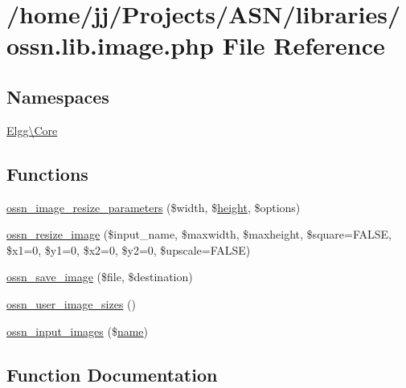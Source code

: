 \hypertarget{ossn_8lib_8image_8php}{}\section{/home/jj/\+Projects/\+A\+S\+N/libraries/ossn.lib.\+image.\+php File Reference}
\label{ossn_8lib_8image_8php}
\subsection*{Namespaces}
\begin{DoxyCompactItemize}
\item 
 \hyperlink{namespace_elgg_1_1_core}{Elgg\textbackslash{}\+Core}
\end{DoxyCompactItemize}
\subsection*{Functions}
\begin{DoxyCompactItemize}
\item 
\hyperlink{ossn_8lib_8image_8php_a998db60a54eb07edcc673ea94bb921fb}{ossn\+\_\+image\+\_\+resize\+\_\+parameters} (\$width, \$\hyperlink{jquery-ui_8min_8js_a7ec7f4e8243c6c20295ecc9a90225d43}{height}, \$options)
\item 
\hyperlink{ossn_8lib_8image_8php_adc046b4fd66e6dfc1f04c42ef6c2a998}{ossn\+\_\+resize\+\_\+image} (\$input\+\_\+name, \$maxwidth, \$maxheight, \$square=F\+A\+L\+SE, \$x1=0, \$y1=0, \$x2=0, \$y2=0, \$upscale=F\+A\+L\+SE)
\item 
\hyperlink{ossn_8lib_8image_8php_aa6e7a9eef0774ab80b3a2fe4c2d0f7a6}{ossn\+\_\+save\+\_\+image} (\$file, \$destination)
\item 
\hyperlink{ossn_8lib_8image_8php_a554bea8c01aee759e58a943c017c2f1e}{ossn\+\_\+user\+\_\+image\+\_\+sizes} ()
\item 
\hyperlink{ossn_8lib_8image_8php_a90854a979b254fd62fe3f5a27927d481}{ossn\+\_\+input\+\_\+images} (\$\hyperlink{user_8php_a765af5e9671743530143a6d3670fd9a6}{name})
\end{DoxyCompactItemize}


\subsection{Function Documentation}
